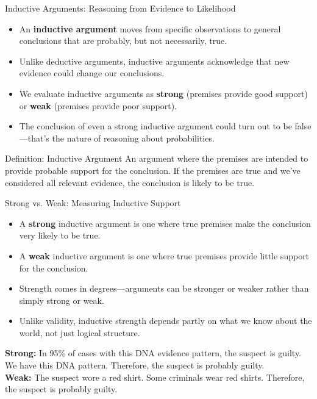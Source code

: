\documentclass{beamer}
\begin{document}
\begin{frame}{Inductive Arguments: Reasoning from Evidence to Likelihood}
	\begin{itemize}
		\item An \textbf{inductive argument} moves from specific observations to general conclusions that are probably, but not necessarily, true.
		\item Unlike deductive arguments, inductive arguments acknowledge that new evidence could change our conclusions.
		\item We evaluate inductive arguments as \textbf{strong} (premises provide good support) or \textbf{weak} (premises provide poor support).
		\item The conclusion of even a strong inductive argument could turn out to be false—that's the nature of reasoning about probabilities.
	\end{itemize}
	
	\begin{block}{Definition: Inductive Argument}
		An argument where the premises are intended to provide probable support for the conclusion. If the premises are true and we've considered all relevant evidence, the conclusion is likely to be true.
	\end{block}
\end{frame}

\begin{frame}{Strong vs. Weak: Measuring Inductive Support}
	\begin{itemize}
		\item A \textbf{strong} inductive argument is one where true premises make the conclusion very likely to be true.
		\item A \textbf{weak} inductive argument is one where true premises provide little support for the conclusion.
		\item Strength comes in degrees—arguments can be stronger or weaker rather than simply strong or weak.
		\item Unlike validity, inductive strength depends partly on what we know about the world, not just logical structure.
	\end{itemize}
	
	\begin{example}
		\textbf{Strong:} In 95\% of cases with this DNA evidence pattern, the suspect is guilty. We have this DNA pattern. Therefore, the suspect is probably guilty.
		\\[0.5em]
		\textbf{Weak:} The suspect wore a red shirt. Some criminals wear red shirts. Therefore, the suspect is probably guilty.
	\end{example}
	\end{frame}
\end{document}
